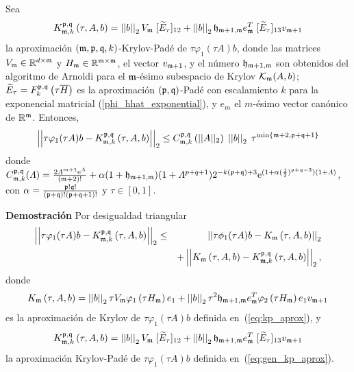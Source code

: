 \begin{theorem}\cite{naranjo2021locally}\label{theorem:Krylov-bound}
	Sea 
	\begin{equation} \label{eq:gen_kp_aprox}
	K_{\mathfrak{m},k}^{\mathfrak{p},\mathfrak{q}}\left(\tau, A , b \right)=\left\lvert \left\lvert b \right\rvert \right\rvert_2 V_{\mathfrak{m}}\;[\widetilde{E}_{\tau}]_{12} + \left\lvert \left\lvert b \right\rvert \right\rvert_2 \mathfrak{h}_{\mathfrak{m}+1,\mathfrak{m}}e_{\mathfrak{m}}^T\;[\widetilde{E}_{\tau}]_{13} v_{\mathfrak{m}+1}
	\end{equation}
	la aproximación $(\mathfrak{m} , \mathfrak{p} ,\mathfrak{q} , k)$-Krylov-Padé de $\tau \varphi_1(\tau A)b$, donde las matrices $V_{\mathfrak{m}}\in\mathbb{R}^{d\times \mathfrak{m}}$ y $H_{\mathfrak{m}}\in\mathbb{R}^{{\mathfrak{m}} \times {\mathfrak{m}}}$, el vector $v_{\mathfrak{m}+1}$, y el número $\mathfrak{h}_{\mathfrak{m}+1,\mathfrak{m}}$ son obtenidos del algoritmo de Arnoldi para el $\mathfrak{m}$-ésimo subespacio de Krylov $\mathcal{K}_{\mathfrak{m}}(A,b)$;  $\widetilde{E}_{\tau}=F_k^{\mathfrak{p},\mathfrak{q}}\left(\tau\overline{H}\right)$ es la aproximación $(\mathfrak{p},\mathfrak{q})$-Padé con escalamiento $k$ para la exponencial matricial (\ref{phi_hhat_exponential}), y $e_m$ el $m$-ésimo vector canónico de $\mathbb{R}^{\mathfrak{m}}$.
	Entonces,
	\begin{equation}
	\left\lvert\left\lvert  \tau \varphi_1(\tau A)b -
	K_{\mf,k}^{\pf,\qf}\left( \tau, A , b \right)\right\rvert\right\rvert_2%
	\leq C_{\mf,k}^{\pf,\qf}\left(\lvert\lvert A \rvert\rvert_2\right) \;
	\nnorm{\nnorm{b}}_2 \; \tau^{\mathrm{min}\left\{ \mf+2,\pf+\qf+1 \right\}}
	\end{equation}
	donde $C_{\mathfrak{m},k}^{\mathfrak{p},\mathfrak{q}}(\varLambda)= \frac{2 \varLambda^{m+1} \mathrm{e}^{\varLambda}}{(\mathfrak{m}+2)!}+
	\alpha (1+\mathfrak{h}_{\mathfrak{m}+1,\mathfrak{m}}) (1+\varLambda^{p+q+1}) 2^{-k(\mathfrak{p}+\mathfrak{q})+3}\mathrm{e}^{(1+\alpha(\frac{1}{2})^{\mathfrak{p}+\mathfrak{q}-3})(1+\varLambda)} $,
	con $\alpha=\frac{\mathfrak{p}!\mathfrak{q}!}{(\mathfrak{p}+\mathfrak{q})!(\mathfrak{p}+\mathfrak{q}+1)!}$ y $\tau \in [0,1]$.
\end{theorem}
\textbf{Demostración} Por desigualdad triangular
\begin{eqnarray} \label{importatdeq}
\left\lvert\left\lvert  \tau \varphi_1(\tau A)b -
K_{\mathfrak{m},k}^{\mathfrak{p},\mathfrak{q}}\left( \tau , A , b \right)\right\rvert\right\rvert_2
& \leq & \left\lvert\left\lvert \tau \phi_1(\tau A)b -  K_{\mathfrak{m}}\left( \tau , A , b \right) \right\rvert\right\rvert_2 \\
& & + \left\lvert\left\lvert  K_{\mathfrak{m}}\left( \tau , A , b \right) -
K_{\mathfrak{m},k}^{\mathfrak{p},\mathfrak{q}}\left( \tau, A , b \right)\right\rvert\right\rvert_2, \nonumber
\end{eqnarray}
donde
\begin{equation*}
K_{\mathfrak{m}}\left(\tau,A , b \right)=\left\lvert \left\lvert b \right\rvert \right\rvert_2 \tau V_{\mathfrak{m}}\varphi_1\left( \tau H_{\mathfrak{m}} \right) e_1 + \left\lvert \left\lvert b \right\rvert \right\rvert_2 \tau^{2}\mathfrak{h}_{\mathfrak{m}+1,\mathfrak{m}}e_{\mathfrak{m}}^T\varphi_2\left(\tau H_{\mathfrak{m}}\right) e_1 v_{\mathfrak{m}+1}
\end{equation*}
es la aproximación de Krylov de $\tau \varphi_1(\tau A)b$ definida en~(\ref{eq:kp_aprox}), y
\begin{equation*}
K_{\mathfrak{m},k}^{\mathfrak{p},\mathfrak{q}}\left(\tau, A , b \right)=\left\lvert \left\lvert b \right\rvert \right\rvert_2 V_{\mathfrak{m}}\;[\widetilde{E}_{\tau}]_{12} + \left\lvert \left\lvert b \right\rvert \right\rvert_2 \mathfrak{h}_{\mathfrak{m}+1,\mathfrak{m}}e_{\mathfrak{m}}^T\;[\widetilde{E}_{\tau}]_{13} v_{\mathfrak{m}+1}
\end{equation*}
la aproximación Krylov-Padé de $\tau \varphi_1(\tau A)b$ definida en~(\ref{eq:gen_kp_aprox}).

